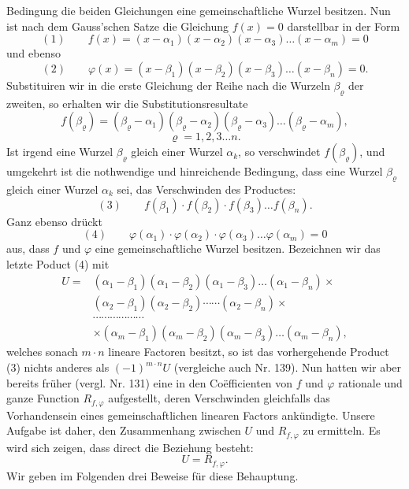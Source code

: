 \documentclass[11pt]{article}
\providecommand{\weberpage}[1]{}
\begin{document}
\weberpage{180}
Bedingung die beiden Gleichungen eine gemeinschaftliche Wurzel besitzen.
Nun ist nach dem Gauss'schen Satze die Gleichung $f(x) = 0$ darstellbar
in der Form
\[
(1) \qquad f(x) = (x - \alpha_1)(x - \alpha_2)(x - \alpha_3) \ldots (x - \alpha_m) = 0
\]
und ebenso
\[
(2) \qquad \varphi(x) = (x - \beta_1)(x - \beta_2)(x - \beta_3) \ldots (x - \beta_n) = 0.
\]
Substituiren wir in die erste Gleichung der Reihe nach die Wurzeln
$\beta_\varrho$ der zweiten, so erhalten wir die Substitutionsresultate
\[
f(\beta_\varrho) = (\beta_\varrho - \alpha_1)(\beta_\varrho - \alpha_2)(\beta_\varrho - \alpha_3) \ldots (\beta_\varrho - \alpha_m),
\]
\[
\varrho = 1, 2, 3 \ldots n.
\]
Ist irgend eine Wurzel $\beta_\varrho$ gleich einer Wurzel $\alpha_k$, so
verschwindet $f(\beta_\varrho)$, und umgekehrt ist die nothwendige und
hinreichende Bedingung, dass eine Wurzel $\beta_\varrho$ gleich einer
Wurzel $\alpha_k$ sei, das Verschwinden des Productes:
\[
(3) \qquad f(\beta_1) \cdot f(\beta_2) \cdot f(\beta_3) \ldots f(\beta_n).
\]
Ganz ebenso drückt
\[
(4) \qquad \varphi(\alpha_1) \cdot \varphi(\alpha_2) \cdot \varphi(\alpha_3) \ldots \varphi(\alpha_m) = 0
\]
aus, dass $f$ und $\varphi$ eine gemeinschaftliche Wurzel besitzen.
Bezeichnen wir das letzte Poduct (4) mit %
\[
\begin{aligned}
U = {}& (\alpha_1 - \beta_1)(\alpha_1 - \beta_2)(\alpha_1 - \beta_3) \ldots (\alpha_1 - \beta_n) \times \\
& (\alpha_2 - \beta_1)(\alpha_2 - \beta_2) \cdots\cdots (\alpha_2 - \beta_n) \times \\
& \cdots\cdots\cdots\cdots\cdots\cdots \\
& \times (\alpha_m - \beta_1)(\alpha_m - \beta_2)(\alpha_m - \beta_3) \ldots (\alpha_m - \beta_n),
\end{aligned}
\]
welches sonach $m \cdot n$ lineare Factoren besitzt, so ist das
vorhergehende Product (3) nichts anderes als $(-1)^{m \cdot n} U$
(vergleiche auch Nr. 139). Nun hatten wir aber bereits früher (vergl.
Nr. 131) eine in den Coëfficienten von $f$ und $\varphi$ rationale und
ganze Function $R_{f,\varphi}$ aufgestellt, deren Verschwinden gleichfalls
das Vorhandensein eines gemeinschaftlichen linearen Factors ankündigte.
Unsere Aufgabe ist daher, den Zusammenhang zwischen $U$ und $R_{f,\varphi}$
zu ermitteln. Es wird sich zeigen, dass direct die Beziehung besteht:
\[
U = R_{f,\varphi}.
\]
Wir geben im Folgenden drei Beweise für diese Behauptung.
\end{document}

